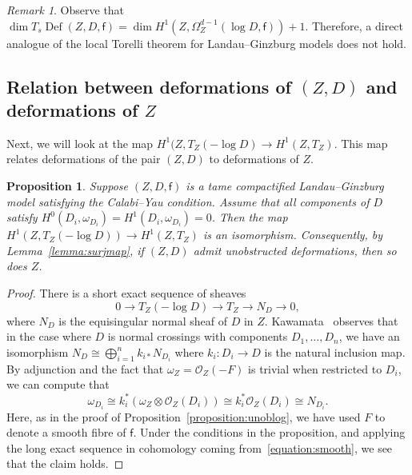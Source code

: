 \documentclass[10pt]{amsart}
\numberwithin{equation}{section}
\theoremstyle{plain}
\newtheorem{proposition}[theorem]{Proposition}
\theoremstyle{definition}
\theoremstyle{remark}
\newtheorem{remark}[theorem]{Remark}
\DeclareMathOperator{\Def}{Def}
\begin{document}
\begin{remark}
  Observe that \(\dim T_s \Def(Z,D,\mathsf{f}) = \dim H^1(Z,\Omega_Z^{d-1}(\log D,\mathsf{f})) + 1\). Therefore, a direct analogue of the local Torelli theorem for Landau--Ginzburg models does not hold.
\end{remark}

\subsection{Relation between deformations of \texorpdfstring{\((Z,D)\)}{(Z,D)} and deformations of \texorpdfstring{\(Z\)}{Z}}

Next, we will look at the map \(H^1(Z,T_Z(-\log D)\rightarrow H^1(Z,T_Z)\). This map relates deformations of the pair \((Z,D)\) to deformations of \(Z\).

\begin{proposition}\label{proposition:lastprop}
  Suppose \((Z,D,\mathsf{f})\) is a tame compactified Landau--Ginzburg model satisfying the Calabi--Yau condition. Assume that all components of \(D\) satisfy \(H^0(D_i,\omega_{D_i}) = H^1(D_i,\omega_{D_i}) = 0\). Then the map \(H^1(Z,T_Z(-\log D))\rightarrow H^1(Z,T_Z)\) is an isomorphism. Consequently, by Lemma~\ref{lemma:surjmap}, if \((Z,D)\) admit unobstructed deformations, then so does \(Z\).
\end{proposition}

\begin{proof}
  There is a short exact sequence of sheaves
  \begin{equation}\label{equation:smooth}
    0 \rightarrow T_Z(-\log D) \rightarrow T_Z \rightarrow N_{D} \rightarrow 0,
  \end{equation}
  where \(N_{D}\) is the {equisingular normal sheaf} of \(D\) in \(Z\).  Kawamata~\cite[pp. 250]{kawamata1977deformations} observes that in the case where \(D\) is normal crossings with components \(D_1, \ldots, D_n\), we have an isomorphism \(N_{D}\cong \bigoplus_{i=1}^n k_{i*}N_{D_i}\) where \(k_i \colon D_i \rightarrow D\) is the natural inclusion map. By adjunction and the fact that \(\omega_Z = \mathcal{O}_Z(-F)\) is trivial when restricted to \(D_i\), we can compute that
  \[
    \omega_{D_i} \cong k_{i}^*(\omega_Z \otimes \mathcal{O}_Z(D_i)) \cong k_{i}^*\mathcal{O}_Z(D_i) \cong N_{D_i}.
  \]
  Here, as in the proof of Proposition~\ref{proposition:unoblog}, we have used \(F\) to denote a smooth fibre of \(\mathsf{f}\). Under the conditions in the proposition, and applying the long exact sequence in cohomology coming from~\eqref{equation:smooth}, we see that the claim holds.
\end{proof}
\end{document}
